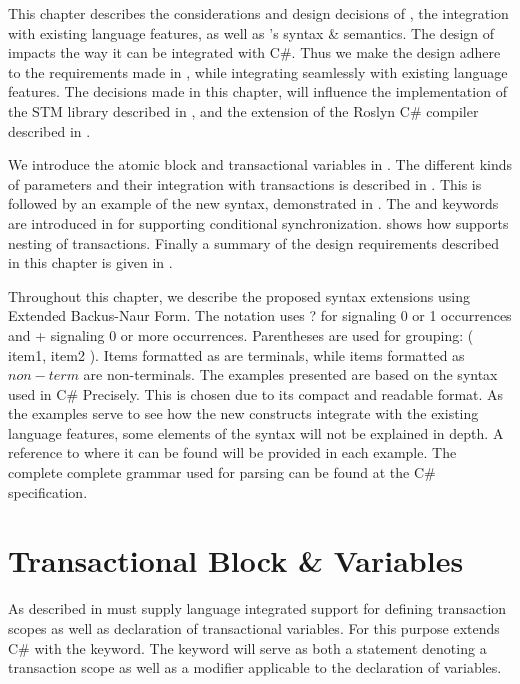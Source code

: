 \makeatletter {}\makeatother
{}
This chapter describes the considerations and design decisions of \stmname, the integration with existing language features, as well as \stmname's syntax \& semantics. The design of \stmnamesp impacts the way it can be integrated with C\#. Thus we make the design adhere to the requirements made in , while integrating seamlessly with existing language features. The decisions made in this chapter, will influence the implementation of the \ac{STM} library described in , and the extension of the Roslyn C\# compiler described in .

We introduce the atomic block and transactional variables in . The different kinds of parameters and their integration with transactions is described in . This is followed by an example of the new syntax, demonstrated in . The  and  keywords are introduced in  for supporting conditional synchronization.  shows how \stmnamesp supports nesting of transactions. Finally a summary of the design requirements described in this chapter is given in .

Throughout this chapter, we describe the proposed syntax extensions using Extended Backus-Naur Form. The notation uses ? for signaling 0 or 1 occurrences and + signaling 0 or more occurrences. Parentheses are used for grouping: ( item1, item2 ). Items formatted as  are  terminals, while items formatted as $non-term$ are non-terminals. The examples presented are based on the syntax used in C\# Precisely\cite{sestoft2011c}. This is chosen due to its compact and readable format. As the examples serve to see how the new constructs integrate with the existing language features, some elements of the syntax will not be explained in depth. A reference to where it can be found will be provided in each example. The complete complete grammar used for parsing can be found at the C\# specification\cite{csharp2013specificaiton}.

\label{chap:stm_design}

\section{Transactional Block \& Variables}\label{sec:stm_design}
As described in  \stmnamesp must supply language integrated support for defining transaction scopes as well as declaration of transactional variables. For this purpose \stmnamesp extends C\# with the  keyword. The  keyword will serve as both a statement denoting a transaction scope as well as a modifier applicable to the declaration of variables. 

